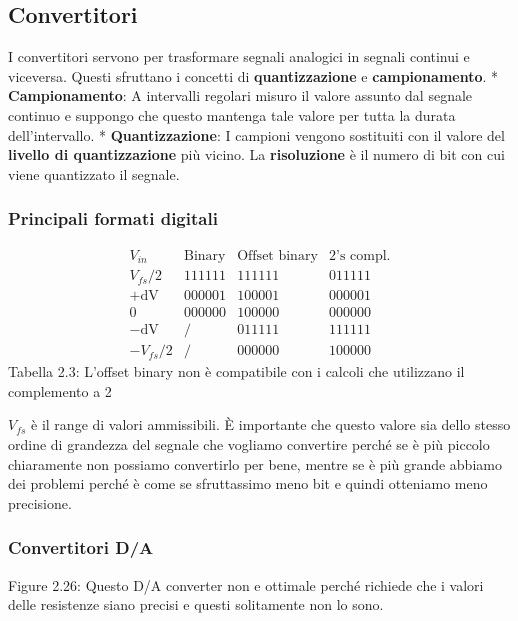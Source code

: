 \documentclass[
]{article}
\begin{document}
\subsection{Convertitori}\label{convertitori}

I convertitori servono per trasformare segnali analogici in segnali
continui e viceversa. Questi sfruttano i concetti di
\textbf{quantizzazione} e \textbf{campionamento}. *
\textbf{Campionamento}: A intervalli regolari misuro il valore assunto
dal segnale continuo e suppongo che questo mantenga tale valore per
tutta la durata dell'intervallo. * \textbf{Quantizzazione}: I campioni
vengono sostituiti con il valore del \textbf{livello di quantizzazione}
più vicino. La \textbf{risoluzione} è il numero di bit con cui viene
quantizzato il segnale.

\subsubsection{Principali formati
digitali}\label{principali-formati-digitali}

\[\begin{array}{c|c|c|c}V_{in}&\text{Binary}&\text{Offset binary}&\text{2's compl.}\\\hline V_{fs}/2&111111&111111&011111\\+\text{dV}&000001&100001&000001\\0&000000&100000&000000\\-\text{dV}&/&011111&111111\\-V_{fs}/2&/&000000&100000\end{array}\]
Tabella 2.3: L'offset binary non è compatibile con i calcoli che
utilizzano il complemento a 2

\(V_{fs}\) è il range di valori ammissibili. È importante che questo
valore sia dello stesso ordine di grandezza del segnale che vogliamo
convertire perché se è più piccolo chiaramente non possiamo convertirlo
per bene, mentre se è più grande abbiamo dei problemi perché è come se
sfruttassimo meno bit e quindi otteniamo meno precisione.

\subsubsection{Convertitori D/A}\label{convertitori-da}

Figure 2.26: Questo D/A converter non e ottimale perché richiede che i
valori delle resistenze siano precisi e questi solitamente non lo sono.
\end{document}
